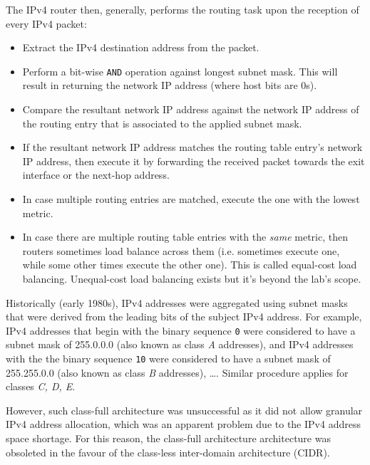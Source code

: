 \documentclass[pdftex,12pt,a4paper]{article}
\begin{document}
            The IPv4 router then, generally, performs the routing task upon the reception
            of every IPv4 packet:
            \begin{itemize}
                \item Extract the IPv4 destination address from the packet.
                \item Perform a bit-wise \texttt{AND} operation against longest
                    subnet mask. This will result in returning the network IP
                    address (where host bits are 0s).
                \item Compare the resultant network IP address against the
                    network IP address of the routing entry that is associated
                    to the applied subnet mask.
                \item If the resultant network IP address matches the routing
                    table entry's network IP address, then execute it by
                    forwarding the received packet towards the exit interface
                    or the next-hop address.
                \item In case multiple routing entries are matched, execute the
                    one with the lowest metric.
                \item In case there are multiple routing table entries with the
                    \emph{same} metric, then routers sometimes load balance
                    across them (i.e. sometimes execute one, while some other
                    times execute the other one). This is called equal-cost
                    load balancing. Unequal-cost load balancing exists but it's
                    beyond the lab's scope.
            \end{itemize}

            Historically (early 1980s), IPv4 addresses were aggregated using
            subnet masks that were derived from the leading bits of the subject
            IPv4 address. For example, IPv4 addresses that begin with the
            binary sequence \texttt{0} were considered to have a subnet mask of
            255.0.0.0 (also known as class \emph{A} addresses), and IPv4
            addresses with the the binary sequence \texttt{10} were considered
            to have a subnet mask of 255.255.0.0 (also known as class \emph{B}
            addresses), \ldots.  Similar procedure applies for classes \emph{C,
            D, E}.

            However, such class-full architecture was unsuccessful as it did
            not allow granular IPv4 address allocation, which was an apparent
            problem due to the IPv4 address space shortage. For this reason,
            the class-full architecture architecture was obsoleted in the
            favour of the class-less inter-domain architecture (CIDR).
\end{document}
